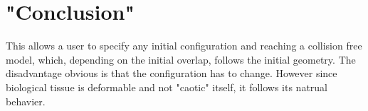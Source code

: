 % 
% 
% 
% 
% 
% 
% 
%
% 
\section{"Conclusion"}
This allows a user to specify any initial configuration and reaching a collision free model, which, depending on the initial overlap, follows the initial geometry.
The disadvantage obvious is that the configuration has to change.
However since biological tissue is deformable and not "caotic" itself, it follows its natrual behavier.
